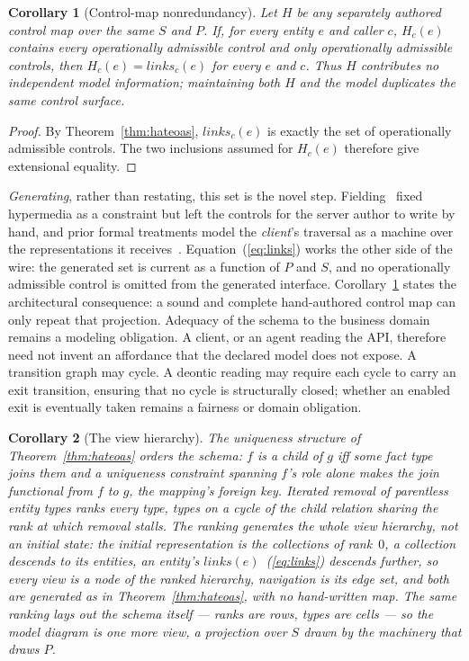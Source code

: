 \documentclass[10pt,twocolumn]{article}
\theoremstyle{plain}
\newtheorem{corollary}{Corollary}
\theoremstyle{definition}
\begin{document}
\begin{corollary}[Control-map nonredundancy]\label{cor:controlmap}
Let $H$ be any separately authored control map over the same $S$ and $P$. If, for every entity $e$ and caller $c$, $H_c(e)$ contains every operationally admissible control and only operationally admissible controls, then $H_c(e)=\mathit{links}_c(e)$ for every $e$ and $c$. Thus $H$ contributes no independent model information; maintaining both $H$ and the model duplicates the same control surface.
\end{corollary}
\begin{proof}
By Theorem~\ref{thm:hateoas}, $\mathit{links}_c(e)$ is exactly the set of operationally admissible controls. The two inclusions assumed for $H_c(e)$ therefore give extensional equality.
\end{proof}

\noindent \emph{Generating}, rather than restating, this set is the novel step. Fielding~\cite{fielding00} fixed hypermedia as a constraint but left the controls for the server author to write by hand, and prior formal treatments model the \emph{client}'s traversal as a machine over the representations it receives~\cite{zuzak11}. Equation~(\ref{eq:links}) works the other side of the wire: the generated set is current as a function of $P$ and $S$, and no operationally admissible control is omitted from the generated interface. Corollary~\ref{cor:controlmap} states the architectural consequence: a sound and complete hand-authored control map can only repeat that projection. Adequacy of the schema to the business domain remains a modeling obligation. A client, or an agent reading the API, therefore need not invent an affordance that the declared model does not expose. A transition graph may cycle. A deontic reading may require each cycle to carry an exit transition, ensuring that no cycle is structurally closed; whether an enabled exit is eventually taken remains a fairness or domain obligation.

\begin{corollary}[The view hierarchy]\label{cor:hier}
The uniqueness structure of Theorem~\ref{thm:hateoas} orders the schema: $f$ is a \emph{child} of $g$ iff some fact type joins them and a uniqueness constraint spanning $f$'s role alone makes the join functional from $f$ to $g$, the mapping's foreign key. Iterated removal of parentless entity types ranks every type, types on a cycle of the child relation sharing the rank at which removal stalls. The ranking generates the \emph{whole} view hierarchy, not an initial state: the initial representation is the collections of rank~$0$, a collection descends to its entities, an entity's $\mathit{links}(e)$~(\ref{eq:links}) descends further, so every view is a node of the ranked hierarchy, navigation is its edge set, and both are generated as in Theorem~\ref{thm:hateoas}, with no hand-written map. The same ranking lays out the schema itself --- ranks are rows, types are cells --- so the model diagram is one more view, a projection over $S$ drawn by the machinery that draws $P$.
\end{corollary}
\end{document}
